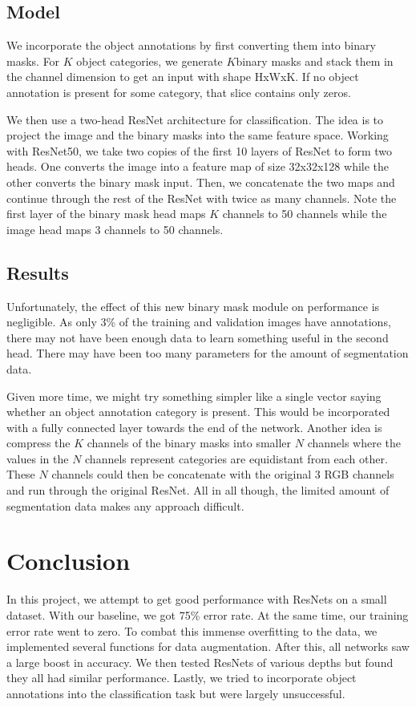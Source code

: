 \documentclass[10pt,twocolumn,letterpaper]{article}
\begin{document}
\subsection{Model}
We incorporate the object annotations by first converting them into binary masks. For $K$ object categories, we generate $K$binary masks and stack them in the channel dimension to get an input with shape HxWxK. If no object annotation is present for some category, that slice contains only zeros.

We then use a two-head ResNet architecture for classification. The idea is to project the image and the binary masks into the same feature space. Working with ResNet50, we take two copies of the first 10 layers of ResNet to form two heads. One converts the image into a feature map of size 32x32x128 while the other converts the binary mask input. Then, we concatenate the two maps and continue through the rest of the ResNet with twice as many channels. Note the first layer of the binary mask head maps $K$ channels to 50 channels while the image head maps $3$ channels to 50 channels.

\subsection{Results}
Unfortunately, the effect of this new binary mask module on performance is negligible. As only 3\% of the training and validation images have annotations, there may not have been enough data to learn something useful in the second head. There may have been too many parameters for the amount of segmentation data. 

Given more time, we might try something simpler like a single vector saying whether an object annotation category is present. This would be incorporated with a fully connected layer towards the end of the network. Another idea is compress the $K$ channels of the binary masks into smaller $N$ channels where the values in the $N$ channels represent categories are equidistant from each other. These $N$ channels could then be concatenate with the original $3$ RGB channels and run through the original ResNet. All in all though, the limited amount of segmentation data makes any approach difficult.

\section{Conclusion}
In this project, we attempt to get good performance with ResNets on a small dataset. With our baseline, we got 75\% error rate. At the same time, our training error rate went to zero. To combat this immense overfitting to the data, we implemented several functions for data augmentation. After this, all networks saw a large boost in accuracy. We then tested ResNets of various depths but found they all had similar performance. Lastly, we tried to incorporate object annotations into the classification task but were largely unsuccessful.

{\small


}
\end{document}
